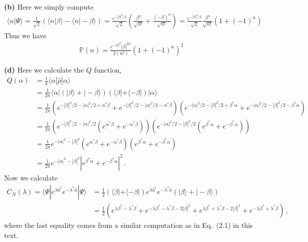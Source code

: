 \documentclass[11pt, oneside]{book}
\theoremstyle{break}
\theoremstyle{break}
\begin{document}
\textbf{(b)} Here we simply compute
\begin{align*}
\langle n |\Psi\rangle = \frac{1}{\sqrt{2}}\left( \langle n |\beta\rangle - \langle n |-\beta\rangle\right) = \frac{e^{-|\beta|^2/2}}{\sqrt{2}}\left(\frac{\beta^n}{\sqrt{n!}}+ \frac{(-\beta)^n}{\sqrt{n!}}  \right) = \frac{e^{-|\beta|^2/2}}{\sqrt{2}}\frac{\beta^n}{\sqrt{n!}}\left(1+ (-1)^n  \right)
\end{align*}
Thus we have
\begin{align*}
\mathbb{P}(n)  = \frac{e^{-|\beta|^2}|\beta|^{2n}}{2(n!)}\left(1+ (-1)^n  \right)^2
\end{align*}

\textbf{(d)} Here we calculate the $Q$ function, 
\begin{align*}
Q(\alpha) 
&= \frac{1}{\pi}\langle \alpha | \hat{\rho} | \alpha\rangle \\
&= \frac{1}{2\pi}\langle \alpha | \left( |\beta \rangle + |-\beta\rangle\right)\left(\langle \beta | + \langle -\beta |\right)|\alpha\rangle\\
&= \frac{1}{2\pi}\left(e^{-|\beta|^2/2 - |\alpha|^2/2 + \alpha^*\beta}+ e^{-|\beta|^2/2 - |\alpha|^2/2-\alpha^*\beta}\right)
\left(e^{-|\alpha|^2/2 - |\beta|^2/2 + \beta^*\alpha}+ e^{-|\alpha|^2/2 - |\beta|^2/2-\beta^*\alpha}\right)\\
&= \frac{1}{2\pi}\left(e^{-|\beta|^2/2 - |\alpha|^2/2}(e^{ \alpha^*\beta}+ e^{-\alpha^*\beta})\right)
\left(e^{-|\alpha|^2/2 - |\beta|^2/2} (e^{ \beta^*\alpha}+e^{-\beta^*\alpha})\right)\\
&= \frac{1}{2\pi}e^{-|\alpha|^2 -|\beta|^2}\left(e^{ \alpha^*\beta}+ e^{-\alpha^*\beta}\right)
\left( e^{ \beta^*\alpha}+e^{-\beta^*\alpha}\right)\\
&= \frac{1}{2\pi}e^{-|\alpha|^2 -|\beta|^2}| e^{ \beta^*\alpha}+e^{-\beta^*\alpha}|^2\,.
\end{align*}
Now we calculate
\begin{align*}
C_N(\lambda) = \langle \Psi | e^{\lambda \hat{a}^\dagger}e^{-\lambda^*\hat{a}}|\Psi \rangle &= 
\frac{1}{2}\left( \langle \beta |+ \langle -\beta |\right)
e^{\lambda \hat{a}^\dagger}e^{-\lambda^*\hat{a}}
\left( |\beta \rangle + |-\beta \rangle\right)\\
&= \frac{1}{2}\left( 
e^{\lambda \beta^* - \lambda^* \beta}
+e^{-\lambda \beta^* - \lambda^* \beta - 2|\beta|^2}
+e^{\lambda\beta^* +\lambda^*\beta- 2|\beta|^2} 
+ e^{-\lambda \beta^* + \lambda^* \beta} \right)\,,
\end{align*}
where the last equality comes from a similar computation as in Eq.\ (2.1) in this text. 
\end{document}
